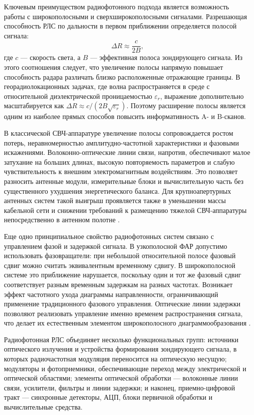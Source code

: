 Ключевым преимуществом радиофотонного подхода является возможность работы с
широкополосными и сверхширокополосными сигналами. Разрешающая способность РЛС
по дальности в первом приближении определяется полосой сигнала:
\begin{equation}
    \Delta R \approx \frac{c}{2B},
\end{equation}
где $c$ --- скорость света, а $B$ --- эффективная полоса зондирующего сигнала. Из
этого соотношения следует, что увеличение полосы напрямую повышает способность
радара различать близко расположенные отражающие границы. В георадиолокационных
задачах, где волна распространяется в среде с относительной диэлектрической
проницаемостью $\varepsilon_r$, выражение дополнительно масштабируется как
$\Delta R \approx c/(2B\sqrt{\varepsilon_r})$. Поэтому расширение полосы является
одним из наиболее прямых способов повысить информативность A- и B-сканов.

В классической СВЧ-аппаратуре увеличение полосы сопровождается ростом потерь,
неравномерностью амплитудно-частотной характеристики и фазовыми искажениями.
Волоконно-оптические линии связи, напротив, обеспечивают малое затухание на больших
длинах, высокую повторяемость параметров и слабую чувствительность к внешним
электромагнитным воздействиям. Это позволяет разносить антенные модули,
измерительные блоки и вычислительную часть без существенного ухудшения
энергетического баланса. Для крупноапертурных антенных систем такой выигрыш
проявляется также в уменьшении массы кабельной сети и снижении требований к
размещению тяжелой СВЧ-аппаратуры непосредственно в антенном полотне
\cite{shumov2016concept}.

Еще одно принципиальное свойство радиофотонных систем связано с управлением
фазой и задержкой сигнала. В узкополосной ФАР допустимо использовать
фазовращатели: при небольшой относительной полосе фазовый сдвиг можно считать
эквивалентным временному сдвигу. В широкополосной системе это приближение
нарушается, поскольку один и тот же фазовый сдвиг соответствует разным временным
задержкам на разных частотах. Возникает эффект частотного ухода диаграммы
направленности, ограничивающий применение традиционного фазового управления.
Оптические линии задержки позволяют реализовать управление именно временем
распространения сигнала, что делает их естественным элементом широкополосного
диаграммообразования \cite{lee1995photonicwideband, pan2014microwave}.

Радиофотонная РЛС объединяет несколько функциональных групп: источники
оптического излучения и устройства формирования зондирующего сигнала, в которых
радиочастотная модуляция переносится на оптическую несущую; модуляторы и
фотоприемники, обеспечивающие переход между электрической и оптической областями;
элементы оптической обработки --- волоконные линии связи, усилители, фильтры и
линии задержки; и наконец, приемно-цифровой тракт --- синхронные детекторы, АЦП,
блоки первичной обработки и вычислительные средства.

